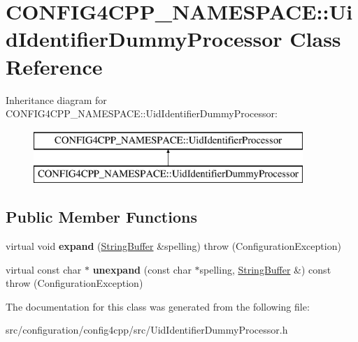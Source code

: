 \hypertarget{classCONFIG4CPP__NAMESPACE_1_1UidIdentifierDummyProcessor}{\section{C\-O\-N\-F\-I\-G4\-C\-P\-P\-\_\-\-N\-A\-M\-E\-S\-P\-A\-C\-E\-:\-:Uid\-Identifier\-Dummy\-Processor Class Reference}
\label{classCONFIG4CPP__NAMESPACE_1_1UidIdentifierDummyProcessor}
}
Inheritance diagram for C\-O\-N\-F\-I\-G4\-C\-P\-P\-\_\-\-N\-A\-M\-E\-S\-P\-A\-C\-E\-:\-:Uid\-Identifier\-Dummy\-Processor\-:\begin{figure}[H]
\begin{center}
\leavevmode
\includegraphics[height=2.000000cm]{classCONFIG4CPP__NAMESPACE_1_1UidIdentifierDummyProcessor}
\end{center}
\end{figure}
\subsection*{Public Member Functions}
\begin{DoxyCompactItemize}
\item 
\hypertarget{classCONFIG4CPP__NAMESPACE_1_1UidIdentifierDummyProcessor_a597bffc1b8bf2107b4e6cbe3276193cd}{virtual void {\bfseries expand} (\hyperlink{classCONFIG4CPP__NAMESPACE_1_1StringBuffer}{String\-Buffer} \&spelling)  throw (\-Configuration\-Exception)}\label{classCONFIG4CPP__NAMESPACE_1_1UidIdentifierDummyProcessor_a597bffc1b8bf2107b4e6cbe3276193cd}

\item 
\hypertarget{classCONFIG4CPP__NAMESPACE_1_1UidIdentifierDummyProcessor_a2da8f01a1fe33af48fde2cf8e4548760}{virtual const char $\ast$ {\bfseries unexpand} (const char $\ast$spelling, \hyperlink{classCONFIG4CPP__NAMESPACE_1_1StringBuffer}{String\-Buffer} \&) const   throw (\-Configuration\-Exception)}\label{classCONFIG4CPP__NAMESPACE_1_1UidIdentifierDummyProcessor_a2da8f01a1fe33af48fde2cf8e4548760}

\end{DoxyCompactItemize}


The documentation for this class was generated from the following file\-:\begin{DoxyCompactItemize}
\item 
src/configuration/config4cpp/src/Uid\-Identifier\-Dummy\-Processor.\-h\end{DoxyCompactItemize}
